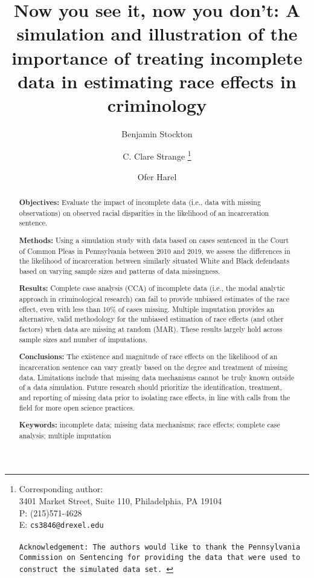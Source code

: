 \documentclass[titlepage]{article}
\title{Now you see it, now you don't: A simulation and illustration of the importance of treating incomplete data in estimating race effects in criminology}
\author[1]{Benjamin Stockton}
\author[2]{C. Clare Strange \thanks{Corresponding author: \\ 3401 Market Street, Suite 110, Philadelphia, PA 19104 \\ P: (215)571-4628 \\ E: \tt{cs3846@drexel.edu} \\ \\ Acknowledgement: The authors would like to thank the Pennsylvania Commission on Sentencing for providing the data that were used to construct the simulated data set. }}
\author[1]{Ofer Harel}
\affil[1]{Department of Statistics, University of Connecticut, Storrs, CT}
\affil[2]{Department of Criminology and Justice Studies, Drexel University, Philadelphia, PA}
\date{} %
\renewcommand{\thefootnote}{\fnsymbol{footnote}}
\begin{document}
\pagestyle{fancy}
\fancyhf{}
\fancyfoot[R]{\thepage}

\maketitle

\renewcommand{\thefootnote}{\arabic{footnote}}

\newpage

\begin{abstract} 
\noindent \textbf{Objectives:} Evaluate the impact of incomplete data (i.e., data with missing observations) on observed racial disparities in the likelihood of an incarceration sentence.

\noindent \textbf{Methods:} Using a simulation study with data based on cases sentenced in the Court of Common Pleas in Pennsylvania between 2010 and 2019, we assess the differences in the likelihood of incarceration between similarly situated White and Black defendants based on varying sample sizes and patterns of data missingness.

\noindent \textbf{Results:} Complete case analysis (CCA) of incomplete data (i.e., the modal analytic approach in criminological research) can fail to provide unbiased estimates of the race effect, even with less than 10\% of cases missing. Multiple imputation provides an alternative, valid methodology for the unbiased estimation of race effects (and other factors) when data are missing at random (MAR). These results largely hold across sample sizes and number of imputations.

\noindent \textbf{Conclusions:} The existence and magnitude of race effects on the likelihood of an incarceration sentence can vary greatly based on the degree and treatment of missing data. Limitations include that missing data mechanisms cannot be truly known outside of a data simulation. Future research should prioritize the identification, treatment, and reporting of missing data prior to isolating race effects, in line with calls from the field for more open science practices.

\noindent \textbf{Keywords:} incomplete data; missing data mechanisms; race effects; complete case analysis; multiple imputation \\
 \end{abstract}



\end{document}
